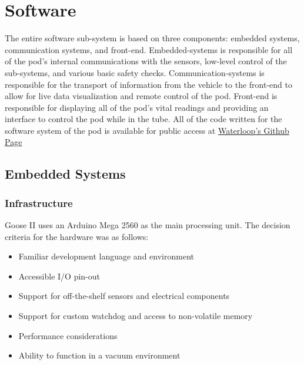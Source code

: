 \documentclass[11pt,a4paper,oldfontcommands]{memoir}
\begin{document}
																																																																											    \section{Software}
																																																																											    The entire software sub-system is based on three components: embedded systems, communication systems, and front-end. Embedded-systems is responsible for all of the pod's internal communications with the sensors, low-level control of the sub-systems, and various basic safety checks. Communication-systems is responsible for the transport of information from the vehicle to the front-end to allow for live data visualization and remote control of the pod. Front-end is responsible for displaying all of the pod's vital readings and providing an interface to control the pod while in the tube. All of the code written for the software system of the pod is available for public access at \href{http://www.sharelatex.com}{Waterloop's Github Page}

																																																																											    \subsection{Embedded Systems}

																																																																											    \subsubsection{Infrastructure}
																																																																											    Goose II uses an Arduino Mega 2560 as the main processing unit. The decision criteria for the hardware was as follows:

																																																																											    \begin{itemize}
																																																																											        \item Familiar development language and environment
																																																																												    \item Accessible I/O pin-out
																																																																												        \item Support for off-the-shelf sensors and electrical components
																																																																													    \item Support for custom watchdog and access to non-volatile memory
																																																																													        \item Performance considerations
																																																																														    \item Ability to function in a vacuum environment
																																																																														    \end{itemize}
																																																																														    \clearpage
\end{document}
